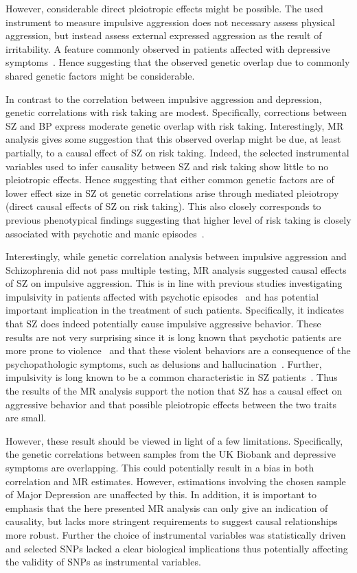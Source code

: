 However, considerable direct pleiotropic effects might be possible.
The used instrument to measure impulsive aggression does not necessary assess physical aggression, but instead assess external expressed aggression as the result of irritability. 
A feature commonly observed in patients affected with depressive symptoms~\cite{Dutton2013,Clark1994}.
Hence suggesting that the observed genetic overlap due to commonly shared genetic factors might be considerable.

In contrast to the correlation between impulsive aggression and depression, genetic correlations with risk taking are modest.
Specifically, corrections between SZ and BP express moderate genetic overlap with risk taking.
Interestingly, MR analysis gives some suggestion that this observed overlap might be due, at least partially, to a causal effect of SZ on risk taking.
Indeed, the selected instrumental variables used to infer causality between SZ and risk taking show little to no pleiotropic effects.
Hence suggesting that either common genetic factors are of lower effect size in SZ ot genetic correlations arise through mediated pleiotropy (direct causal effects of SZ on risk taking). 
This also closely corresponds to previous phenotypical findings suggesting that higher level of risk taking is closely associated with psychotic and manic episodes~\cite{Johnson2012,APA1994,AmericanPsychiatricAssociation2013}.

Interestingly, while genetic correlation analysis between impulsive aggression and Schizophrenia did not pass multiple testing, MR analysis suggested causal effects of SZ on impulsive aggression. 
This is in line with previous studies investigating impulsivity in patients affected with psychotic episodes~\cite{Ouzir2013} and has potential important implication in the treatment of such patients.
Specifically, it indicates that SZ does indeed potentially cause impulsive aggressive behavior.
These results are not very surprising since it is long known that psychotic patients are more prone to violence~\cite{Douglas2009} and that these violent behaviors are a consequence of the psychopathologic symptoms, such as delusions and hallucination~\cite{Swanson2006}.
Further, impulsivity is long known to be a common characteristic in SZ patients~\citet{Ouzir2013}.
Thus the results of the MR analysis support the notion that SZ has a causal effect on aggressive behavior and that possible pleiotropic effects between the two traits are small.

However, these result should be viewed in light of a few limitations.
Specifically, the genetic correlations between samples from the UK Biobank and depressive symptoms are overlapping.
This could potentially result in a bias in both correlation and MR estimates.
However, estimations involving the chosen sample of Major Depression are unaffected by this.
In addition, it is important to emphasis that the here presented MR analysis can only give an indication of causality, but lacks more stringent requirements to suggest causal relationships more robust.
Further the choice of instrumental variables was statistically driven and selected SNPs lacked a clear biological implications thus potentially affecting the validity of SNPs as instrumental variables.

